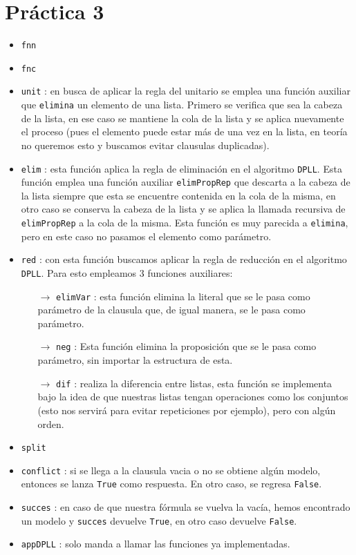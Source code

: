 \documentclass{article}
\newcommand{\code}[1]{\textcolor{white!25!black}{\texttt{#1}}}
\begin{document}
\section*{\LARGE{Práctica 3}}
\newcommand{\localtextbulletone}{\textcolor{black}{\raisebox{.45ex}{\rule{.6ex}{.6ex}}}}
\renewcommand{\labelitemi}{\localtextbulletone}
\begin{itemize}
\item \code{fnn}
\item \code{fnc}
\item \code{unit} : en busca de aplicar la regla del unitario se emplea una función auxiliar que
  \code{elimina} un elemento de una lista. Primero se verifica que sea la cabeza de la lista, en
  ese caso se mantiene la cola de la lista y se aplica nuevamente el proceso (pues el elemento
  puede estar más de una vez en la lista, en teoría no queremos esto y buscamos evitar clausulas
  duplicadas).
\item \code{elim} : esta función aplica la regla de eliminación en el algoritmo \code{DPLL}. Esta
  función emplea una función auxiliar \code{elimPropRep} que descarta a la cabeza de la lista siempre
  que esta se encuentre contenida en la cola de la misma, en otro caso se conserva la cabeza de la
  lista y se aplica la llamada recursiva de \code{elimPropRep} a la cola de la misma. Esta función
  es muy parecida a \code{elimina}, pero en este caso no pasamos el elemento como parámetro.
\item \code{red} : con esta función buscamos aplicar la regla de reducción en el algoritmo \code{DPLL}.
  Para esto empleamos $3$ funciones auxiliares:
  \begin{itemize}
  \item[$\rightarrow$] \code{elimVar} : esta función elimina la literal que se le pasa como parámetro
    de la clausula que, de igual manera, se le pasa como parámetro.
  \item[$\rightarrow$] \code{neg} : Esta función elimina la proposición que se le pasa como parámetro,
    sin importar la estructura de esta.
  \item[$\rightarrow$] \code{dif} : realiza la diferencia entre listas, esta función se implementa bajo
    la idea de que nuestras listas tengan operaciones como los conjuntos (esto nos servirá para evitar
    repeticiones por ejemplo), pero con algún orden.
  \end{itemize}
\item \code{split}
\item \code{conflict} : si se llega a la clausula vacia o no se obtiene algún modelo, entonces se lanza
  \code{True} como respuesta. En otro caso, se regresa \code{False}.
\item \code{succes} : en caso de que nuestra fórmula se vuelva la vacía, hemos encontrado un modelo y
  \code{succes} devuelve \code{True}, en otro caso devuelve \code{False}.
\item \code{appDPLL} : solo manda a llamar las funciones ya implementadas.
\end{itemize}
\end{document}
